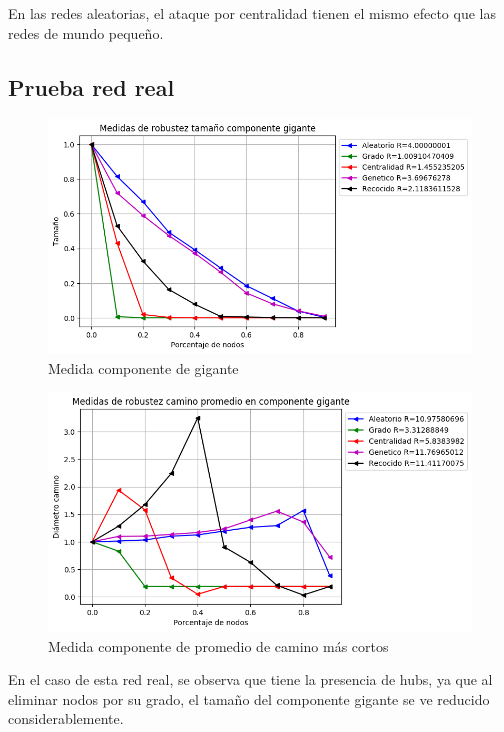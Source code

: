 En las redes aleatorias, el ataque por centralidad tienen el mismo efecto que las redes de mundo pequeño.


\subsection{Prueba red real}

\begin{figure}[H]
    \centering
    \includegraphics[scale=0.7]{Capitulo5Robustez/imagenes/grafica_GC20180508_020345Celengs.png}
    \caption{Medida componente de gigante}
\end{figure}


\begin{figure}[H]
    \centering
    \includegraphics[scale=0.7]{Capitulo5Robustez/imagenes/grafica_APL20180508_020345Celengs.png}
    \caption{Medida componente de promedio de camino más cortos}
\end{figure}


En el caso de esta red real, se observa que tiene la presencia de hubs, ya que al eliminar nodos por su grado, el tamaño del componente gigante se ve reducido considerablemente.

